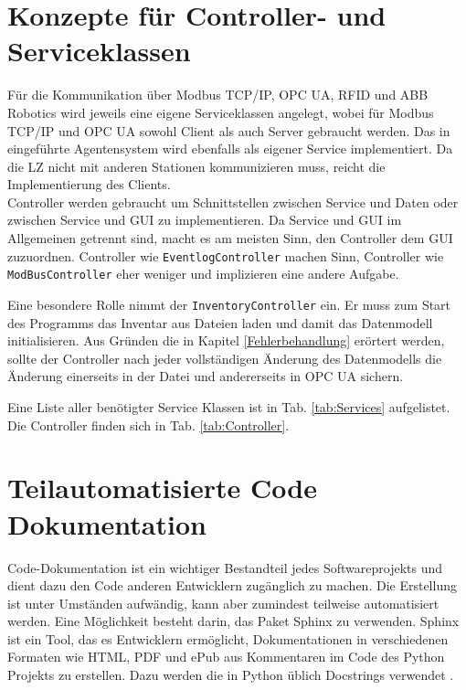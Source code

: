 \section{Konzepte für Controller- und Serviceklassen}\label{ControllerServices}

Für die Kommunikation über Modbus TCP/IP, OPC UA, RFID und ABB Robotics wird jeweils eine eigene Serviceklassen angelegt,
wobei für Modbus TCP/IP  und OPC UA sowohl Client als auch Server gebraucht werden.
Das in \cite{LarsKistner2017} eingeführte Agentensystem wird ebenfalls als eigener Service implementiert.
Da die LZ nicht mit anderen Stationen kommunizieren muss, reicht die Implementierung des Clients.\\

Controller werden gebraucht um Schnittstellen zwischen Service und Daten oder zwischen Service und GUI zu implementieren.
Da Service und GUI im Allgemeinen getrennt sind, macht es am meisten Sinn, den Controller dem GUI zuzuordnen.
Controller wie \verb|EventlogController| machen Sinn, Controller wie \verb|ModBusController| eher weniger und implizieren
eine andere Aufgabe.

Eine besondere Rolle nimmt der \verb|InventoryController| ein.
Er muss zum Start des Programms das Inventar aus Dateien laden und damit das Datenmodell initialisieren.
Aus Gründen die in Kapitel \ref{Fehlerbehandlung} erörtert werden, sollte der Controller nach jeder vollständigen Änderung
des Datenmodells die Änderung einerseits in der Datei und andererseits in OPC UA sichern.

Eine Liste aller benötigter Service Klassen ist in Tab. \ref{tab:Services} aufgelistet.
Die Controller finden sich in Tab. \ref{tab:Controller}.





\newpage
\section{Teilautomatisierte Code Dokumentation}

Code-Dokumentation ist ein wichtiger Bestandteil jedes Softwareprojekts und dient dazu den Code anderen Entwicklern zugänglich zu machen.
Die Erstellung ist unter Umständen aufwändig, kann aber zumindest teilweise automatisiert werden.
Eine Möglichkeit besteht darin, das Paket Sphinx zu verwenden.
Sphinx ist ein Tool, das es Entwicklern ermöglicht, Dokumentationen in verschiedenen Formaten wie HTML, PDF und ePub
aus Kommentaren im Code des Python Projekts zu erstellen.
Dazu werden die in Python üblich Docstrings verwendet \cite{pepDocstrings}.\\

